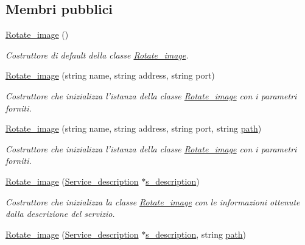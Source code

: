 \subsection*{Membri pubblici}
\begin{DoxyCompactItemize}
\item 
\hyperlink{class_rotate__image_a3bc89728401a10db11d79ea841f5c1e3}{Rotate\-\_\-image} ()
\begin{DoxyCompactList}\small\item\em Costruttore di default della classe \hyperlink{class_rotate__image}{Rotate\-\_\-image}. \end{DoxyCompactList}\item 
\hyperlink{class_rotate__image_a429fab26a1695b3b904a3f20eca28784}{Rotate\-\_\-image} (string name, string address, string port)
\begin{DoxyCompactList}\small\item\em Costruttore che inizializza l'istanza della classe \hyperlink{class_rotate__image}{Rotate\-\_\-image} con i parametri forniti. \end{DoxyCompactList}\item 
\hyperlink{class_rotate__image_a087945bc368560697a8dcb3728d045b7}{Rotate\-\_\-image} (string name, string address, string port, string \hyperlink{class_rotate__image_a30a932131de7296fef03f8c47d65594e}{path})
\begin{DoxyCompactList}\small\item\em Costruttore che inizializza l'istanza della classe \hyperlink{class_rotate__image}{Rotate\-\_\-image} con i parametri forniti. \end{DoxyCompactList}\item 
\hyperlink{class_rotate__image_a04bc5f8be9d04ddde1268ec7a8c086d7}{Rotate\-\_\-image} (\hyperlink{struct_service__description}{Service\-\_\-description} $\ast$\hyperlink{class_service_a55e991ff18c0dceca202388a771283dc}{s\-\_\-description})
\begin{DoxyCompactList}\small\item\em Costruttore che inizializza la classe \hyperlink{class_rotate__image}{Rotate\-\_\-image} con le informazioni ottenute dalla descrizione del servizio. \end{DoxyCompactList}\item 
\hyperlink{class_rotate__image_afbc9a78fd11c1181a516f31fa2341d8b}{Rotate\-\_\-image} (\hyperlink{struct_service__description}{Service\-\_\-description} $\ast$\hyperlink{class_service_a55e991ff18c0dceca202388a771283dc}{s\-\_\-description}, string \hyperlink{class_rotate__image_a30a932131de7296fef03f8c47d65594e}{path})

\end{DoxyCompactItemize}

